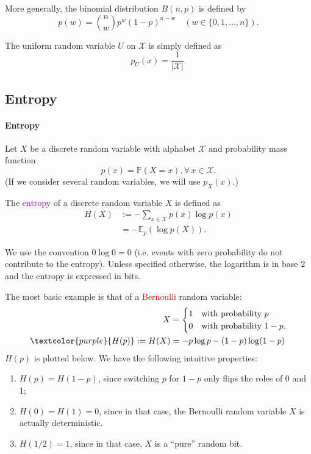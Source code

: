 \documentclass[a4paper, 11pt, openany]{book}
\numberwithin{equation}{section}
\theoremstyle{plain}
\theoremstyle{definition}
\newcommand{\probability}{\mathbb{P}}
\newcommand{\expectation}{\mathbb{E}}
\newcommand{\Important}[1]{\textcolor{red}{#1}}
\newcommand{\Define}[1]{\textcolor{purple}{#1}}
\newcommand{\alphabet}[1]{\mathcal{#1}}
\begin{document}
More generally, the binomial distribution $B(n,p)$ is defined by
$$
	p(w) = \binom{n}{w} p^w (1-p)^{n-w} \quad (w \in \{0,1, \dots, n\}).
$$

The uniform random variable $U$ on $\alphabet{X}$ is simply defined as
$$
	p_U(x) = \frac{1}{|\alphabet{X}|}.
$$




\subsection{Entropy}

\paragraph{Entropy}
Let $X$ be a discrete random variable with alphabet $\alphabet{X}$ and probability mass function
$$
	p(x) = \probability(X = x), \forall \, x \in \alphabet{X}.
$$
(If we consider several random variables, we will use $p_X(x)$.)

The \Define{entropy} of a discrete random variable $X$ is defined as
\begin{align*}
	H(X) &:= - \sum_{x \in \alphabet{X}} p(x) \log p(x)\\
	&= - \expectation_p ( \log p(X) ).
\end{align*}

We use the convention $0 \log 0 = 0$ (i.e. events with zero probability do not contribute to the entropy). Unless specified otherwise, the logarithm is in base $2$ and the entropy is expressed in bits.


The most basic example is that of a \Important{Bernoulli} random variable:
\begin{align*}
	X &= \begin{cases}
			1 & \mbox{with probability } p\\
			0 & \mbox{with probability } 1-p.
		\end{cases}\\
	\Define{H(p)} := H(X) &= -p \log p - (1-p) \log(1-p)
\end{align*}
$H(p)$ is plotted below. We have the following intuitive properties:
\begin{enumerate}
    \item $H(p) = H(1-p)$, since switching $p$ for $1-p$ only flips the roles of $0$ and $1$;
    
    \item $H(0) = H(1) = 0$, since in that case, the Bernoulli random variable $X$ is actually deterministic.
    
    \item $H(1/2) = 1$, since in that case, $X$ is a ``pure'' random bit.
\end{enumerate}
\end{document}
